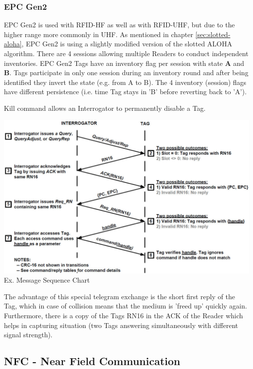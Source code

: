 \subsubsection{EPC Gen2}
	EPC Gen2 is used with RFID-HF as well as with RFID-UHF, but due to the higher range more commonly in UHF.
	As mentioned in chapter \ref{sec:slotted-aloha}, EPC Gen2 is using a slightly modified version of the slotted ALOHA algorithm.
	There are 4 sessions allowing multiple Readers to conduct independent inventories. EPC Gen2 Tags have an inventory flag per session
	with state \textbf{A} and \textbf{B}. Tags participate in only one session during an inventory round and after being identified they 
	invert the state (e.g. from A to B). The 4 inventory (session) flags have different persistence (i.e. time Tag stays in 'B' before
	reverting back to 'A').
	
	Kill command allows an Interrogator to permanently disable a Tag.
	
	\begin{minipage}{14cm}
		\begin{center}
			\includegraphics[width=14cm]{./bilder/rfid-epc-msc.png} \\ Ex. Message Sequence Chart
		\end{center}
	\end{minipage}
	
	The advantage of this special telegram exchange is the short first reply of the Tag, which in case of collision means that the medium
	is 'freed up' quickly again. Furthermore, there is a copy of the Tags RN16 in the ACK of the Reader which helps in capturing situation
	(two Tags answering simultaneously with different signal strength).
	
	
\subsection{NFC - Near Field Communication}
	
